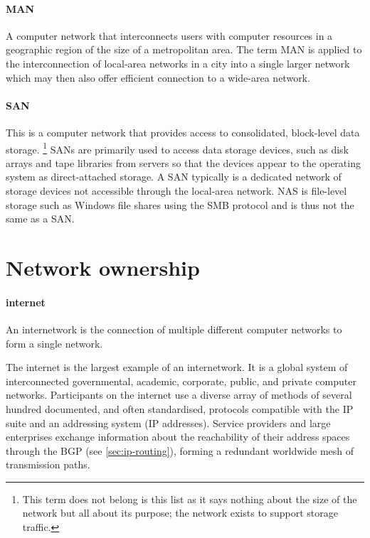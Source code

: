 \paragraph{\gls{MAN}}%
A computer network that interconnects users with computer resources in a geographic region of the size of a metropolitan area.
The term \gls{MAN} is applied to the interconnection of local-area networks in a city into a single larger network which may then also offer efficient connection to a wide-area network.

\paragraph{\gls{SAN}}%
This is a computer network that provides access to consolidated, block-level data storage.%
   \footnote{This term does not belong is this list as it says nothing about the size of the network but all about its purpose; the network exists to support storage traffic.}
\glspl{SAN} are primarily used to access data storage devices, such as disk arrays and tape libraries from servers so that the devices appear to the operating system as direct-attached storage.
A \gls{SAN} typically is a dedicated network of storage devices not accessible through the local-area network.
\Gls{NAS} is file-level storage such as Windows file shares using the \acs{SMB} protocol and is thus not the same as a \acs{SAN}.




\section{Network ownership}
\label{sec:network-ownership}

\paragraph{internet}%
An internetwork is the connection of multiple different computer networks to form a single network.

The internet is the largest example of an internetwork.
It is a global system of interconnected governmental, academic, corporate, public, and private computer networks.
Participants on the internet use a diverse array of methods of several hundred documented, and often standardised, protocols compatible with the \acl{IP} suite and an addressing system (\acs{IP} addresses).
Service providers and large enterprises exchange information about the reachability of their address spaces through the \acf{BGP} (see \vref{sec:ip-routing}), forming a redundant worldwide mesh of transmission paths.

